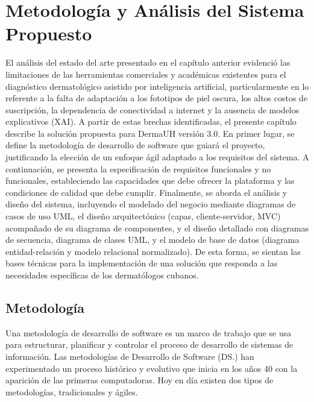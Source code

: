 \chapter{Metodología y Análisis del Sistema Propuesto}

El análisis del estado del arte presentado en el capítulo anterior evidenció las 
limitaciones de las herramientas comerciales y académicas existentes para el diagnóstico 
dermatológico asistido por inteligencia artificial, particularmente en lo referente a la 
falta de adaptación a los fototipos de piel oscura, los altos costos de suscripción, 
la dependencia de conectividad a internet y la ausencia de modelos explicativos (XAI). 
A partir de estas brechas identificadas, el presente capítulo describe la solución 
propuesta para DermaUH versión 3.0. En primer lugar, se define la metodología de desarrollo
de software que guiará el proyecto, justificando la elección de un enfoque ágil adaptado 
a los requisitos del sistema. A continuación, se presenta 
la especificación de requisitos funcionales y no funcionales, estableciendo las 
capacidades que debe ofrecer la plataforma y las condiciones de calidad que debe cumplir. 
Finalmente, se aborda el análisis y diseño del sistema, incluyendo el modelado del negocio 
mediante diagramas de casos de uso UML, el diseño arquitectónico (capas, cliente-servidor, 
MVC) acompañado de su diagrama de componentes, y el diseño detallado con diagramas de 
secuencia, diagrama de clases UML, y el modelo de base de datos (diagrama entidad-relación 
y modelo relacional normalizado). De esta forma, se sientan las bases técnicas para la 
implementación de una solución que responda a las necesidades específicas de los 
dermatólogos cubanos.

\section{Metodolog\'ia}
Una metodología de desarrollo de software es un marco de trabajo que se
usa para estructurar, planificar y controlar el proceso de desarrollo de
sistemas de información. Las metodologías de Desarrollo de Software (DS.) han experimentado un
proceso histórico y evolutivo que inicia en los años 40 con la aparición de las
primeras computadoras. Hoy en d\'ia existen dos tipos de metodolog\'ias, tradicionales y \'agiles. \cite{metodology}

